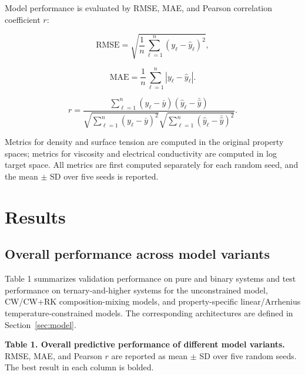 \documentclass[journal=jctcce,manuscript=article,doi=true]{achemso}
\begin{document}
Model performance is evaluated by RMSE, MAE, and Pearson correlation coefficient \(r\):

\[
\mathrm{RMSE}
=
\sqrt{
\frac{1}{n}\sum_{\ell=1}^{n}(y_\ell-\hat{y}_\ell)^2
},
\tag{13}
\]

\[
\mathrm{MAE}
=
\frac{1}{n}\sum_{\ell=1}^{n}|y_\ell-\hat{y}_\ell|.
\tag{14}
\]

\[
r
=
\frac{
\sum_{\ell=1}^{n}(y_\ell-\bar{y})(\hat{y}_\ell-\bar{\hat{y}})
}{
\sqrt{\sum_{\ell=1}^{n}(y_\ell-\bar{y})^2}
\sqrt{\sum_{\ell=1}^{n}(\hat{y}_\ell-\bar{\hat{y}})^2}
}.
\tag{15}
\]

Metrics for density and surface tension are computed in the original property spaces; metrics for viscosity and electrical conductivity are computed in log target space. All metrics are first computed separately for each random seed, and the mean \(\pm\) SD over five seeds is reported.

\section{Results}\label{sec:results}

\subsection{Overall performance across model variants}\label{sec:overall-performance}

Table 1 summarizes validation performance on pure and binary systems and test performance on ternary-and-higher systems for the unconstrained model, CW/CW+RK composition-mixing models, and property-specific linear/Arrhenius temperature-constrained models. The corresponding architectures are defined in Section~\ref{sec:model}.

\noindent\textbf{Table 1. Overall predictive performance of different model variants.} RMSE, MAE, and Pearson \(r\) are reported as mean \(\pm\) SD over five random seeds. The best result in each column is bolded.
\end{document}
